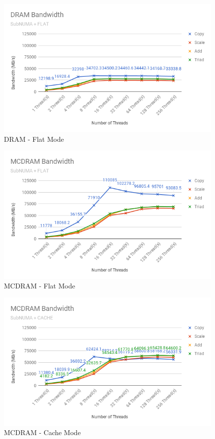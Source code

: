 \documentclass[bsc,frontabs,twoside,singlespacing,parskip,deptreport]{infthesis}     %
\begin{document}
\begin{figure}[!h]
    \centering
    \includegraphics[width=\textwidth]{Results/dram_snc4_f.png}
    \caption{DRAM - Flat Mode}
    \label{res:dram-snc4-f}
\end{figure}

\begin{figure}[!h]
    \centering
    \includegraphics[width=\textwidth]{Results/mcdram_snc4_f.png}
    \caption{MCDRAM - Flat Mode}
    \label{res:mcdram-snc4-f}
\end{figure}

\begin{figure}[!h]
    \centering
    \includegraphics[width=\textwidth]{Results/mcdram_snc4_c.png}
    \caption{MCDRAM - Cache Mode}
    \label{res:mcdram-snc4-c}
\end{figure}
\end{document}
